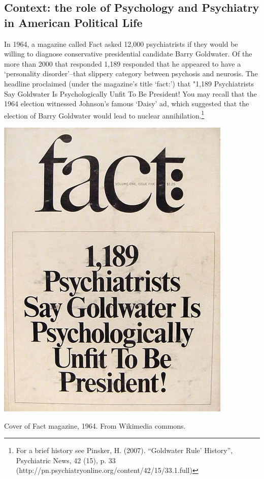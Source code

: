 \begin{refsection}
\subsection{Context: the role of Psychology and Psychiatry in American Political Life}
\label{context:theroleofpsychologyandpsychiatryinamericanpoliticallife}

In 1964, a magazine called Fact asked 12,000 psychiatrists if they would be willing to diagnose conservative presidential candidate Barry Goldwater. Of the more than 2000 that responded 1,189 responded that he appeared to have a `personality disorder'--that slippery category between psychosis and neurosis. The headline proclaimed (under the magazine's title `fact:') that "1,189 Psychiatrists Say Goldwater Is Psychologically Unfit To Be President! You may recall that the 1964 election witnessed Johnson's famous `Daisy' ad, which suggested that the election of Barry Goldwater would lead to nuclear annihilation.\footnote{For a brief history see Pinsker, H. (2007). ``Goldwater Rule' History'', Psychiatric News, 42 (15), p. 33 (http:\slash \slash pn.psychiatryonline.org\slash content\slash 42\slash 15\slash 33.1.full)} \begin{marginfigure}
 \begin{center}

     \includegraphics{../images/Goldwater_fact_magazine.jpg}
\end{center}
 \caption{Cover of Fact magazine, 1964. From Wikimedia commons.}
\label{fig: 1964Fact}
\end{marginfigure}



\end{refsection}
